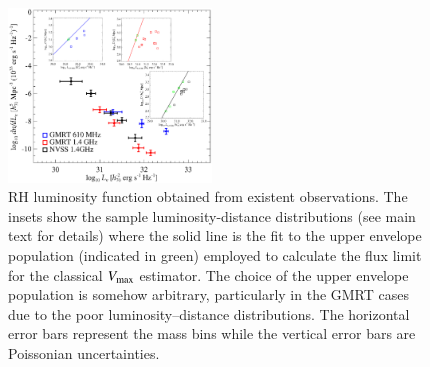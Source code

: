 \documentclass[useAMS,usenatbib]{mn2e}
\begin{document}
\begin{appendix}
\begin{figure} 
\centering
\includegraphics[width=0.48\textwidth]{figures/RLF_observations.eps}
\caption{RH luminosity function obtained from existent observations. The insets
  show the sample luminosity-distance distributions (see main text for details)
  where the solid line is the fit to the upper envelope population (indicated in
  green) employed to calculate the flux limit for the classical $V_{{\mathrm{max}}}$
  estimator. The choice of the upper envelope population is somehow arbitrary,
  particularly in the GMRT cases due to the poor luminosity--distance
  distributions. The horizontal error bars represent the mass bins while the
  vertical error bars are Poissonian uncertainties.}
\label{fig:RLFobs}
\end{figure}

\end{appendix}


\label{lastpage}
\end{document}
